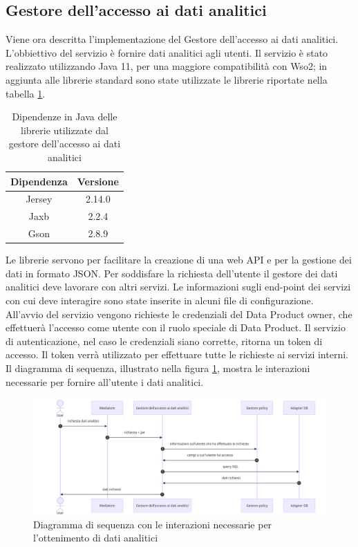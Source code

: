 \documentclass[12pt]{report}
\begin{document}
\subsection{Gestore dell'accesso ai dati analitici}
Viene ora descritta l'implementazione del Gestore dell'accesso ai dati analitici.
L'obbiettivo del servizio è fornire dati analitici agli utenti.
Il servizio è stato realizzato utilizzando Java 11, per una maggiore compatibilità con Wso2; in aggiunta alle librerie standard sono state utilizzate le librerie riportate nella tabella \ref{tab:dependencies}.
\begin{table}[H]
\centering
\begin{tabular}{|c|c|}
    \hline
    Dipendenza & Versione \\
    \hline
    Jersey & 2.14.0 \\
    Jaxb & 2.2.4 \\
    Gson & 2.8.9 \\
    \hline
\end{tabular}
\caption{Dipendenze in Java delle librerie utilizzate dal gestore dell'accesso ai dati analitici}
\label{tab:dependencies}
\end{table}
Le librerie servono per facilitare la creazione di una web API e per la gestione dei dati in formato JSON.
Per soddisfare la richiesta dell'utente il gestore dei dati analitici deve lavorare con altri servizi.
Le informazioni sugli end-point dei servizi con cui deve interagire sono state inserite in alcuni file di configurazione.
All'avvio del servizio vengono richieste le credenziali del Data Product owner, che effettuerà l'accesso come utente con il ruolo speciale di Data Product.
Il servizio di autenticazione, nel caso le credenziali siano corrette, ritorna un token di accesso.
Il token verrà utilizzato per effettuare tutte le richieste ai servizi interni.
Il diagramma di sequenza, illustrato nella figura \ref{fig:sequenza dati analitici}, mostra le interazioni necessarie per fornire all'utente i dati analitici.
\begin{figure}
    \centering
    \includegraphics[width=\linewidth]{immagini/Gestore Dati analtici.png}
    \caption{Diagramma di sequenza con le interazioni necessarie per l'ottenimento di dati analitici}
    \label{fig:sequenza dati analitici}
\end{figure}
\end{document}
